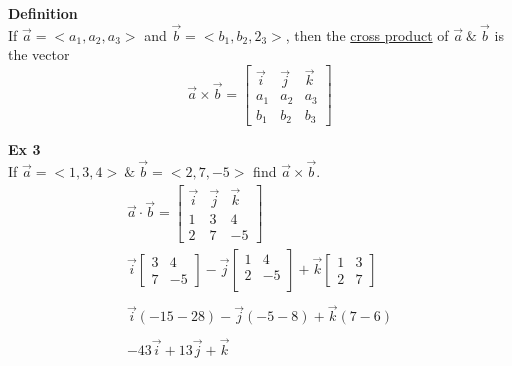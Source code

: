 \documentclass{article}
\begin{document}
  \textbf{Definition}\\
  If $ \vec{ a }  = < a_1, a_2, a_3> $ and $ \vec{ b } = < b_1, b_2, 2_3>   $, then the \underline{cross product} of $ \vec{ a } ~\&~ \vec{ b }   $ is the vector
  \[
    \vec{a} \times \vec{ b } =
    \begin{bmatrix}
      \vec{ i } & \vec{ j } & \vec{ k }\\
      a_1 &a_2 &a_3\\
      b_1 &b_2 &b_3
    \end{bmatrix}
  \]
  
  \textbf{Ex 3}\\
  If $ \vec{ a } = < 1, 3, 4>   ~ \&~ \vec{ b } = < 2, 7, -5>  $ find $ \vec{ a } \times \vec{b }$.
  \[
    \begin{gathered}
    \vec{ a } \cdot \vec{ b } =
    \begin{bmatrix}
      \vec{ i } & \vec{ j } & \vec{ k }  \\
      1 &3 &4\\
      2 &7 &-5
    \end{bmatrix}\\
    \vec{ i } 
    \begin{bmatrix}
      3 & 4\\
      7 &-5
    \end{bmatrix} -
    \vec{j} \begin{bmatrix}
      1 &4 \\
      2 &-5\\
    \end{bmatrix} +
    \vec{k} \begin{bmatrix}
      1 & 3\\
      2 & 7
    \end{bmatrix}\\
    ~\\
    \vec{i} (-15-28) - \vec{j}(-5-8) + \vec{k}(7-6)\\
    ~\\
    \boxed{-43\vec{i} + 13\vec{j} + \vec{k}} 
    \end{gathered}
  \]
\end{document}
